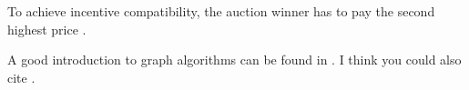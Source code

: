 \documentclass{article}
\begin{document}
To achieve incentive compatibility, the auction winner has to pay the second highest price \cite{Vickrey1961}.

A good introduction to graph algorithms can be found in \cite{Golumbic2004}. I think you could also cite \cite{Grandstrand2004}. 



\end{document}
